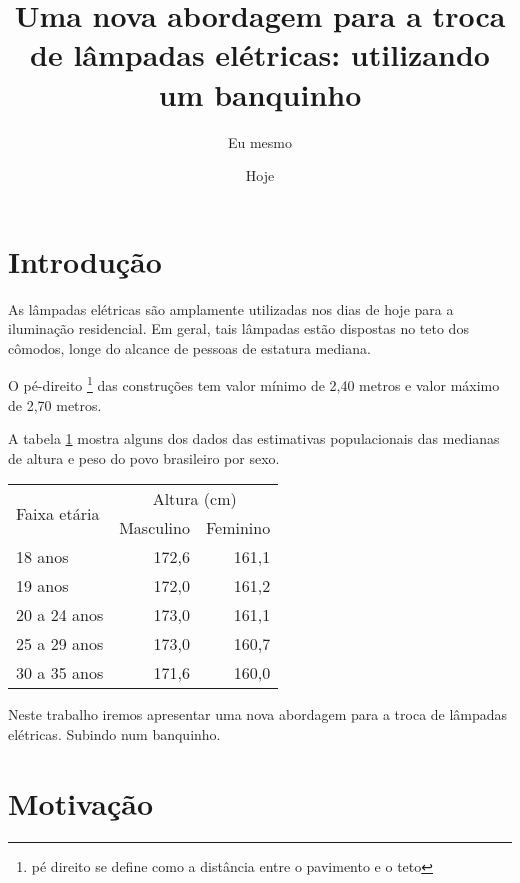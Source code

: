 \documentclass{article}
\author{Eu mesmo}
\date{Hoje}
\title{Uma nova abordagem para a troca de
       lâmpadas elétricas: utilizando um banquinho}
\begin{document}
\maketitle

\newpage

\section{Introdução}
\label{sec:intro}

As lâmpadas elétricas são amplamente utilizadas nos dias
de hoje para a iluminação residencial.
Em geral, tais lâmpadas estão dispostas no teto dos cômodos,
longe do alcance de pessoas de estatura mediana.

O pé-direito 
\footnote{pé direito se define como a distância entre o pavimento e o teto}
das construções tem valor mínimo de 2,40 metros e valor máximo de 2,70 metros.

A tabela \ref{tab:ibge} mostra alguns dos dados das estimativas populacionais das
medianas de altura e peso do povo brasileiro por sexo.

\begin{table}[!htb]
  	\centering
  	\begin{tabular}{|l|r|r|}
  	\hline
    \multirow{2}{*}{Faixa etária} & \multicolumn{2}{|c|}{Altura (cm)} \\ \cline{2-3}
                 & Masculino & Feminino \\ \hline
    18      anos & 172,6 & 161,1 \\
    19      anos & 172,0 & 161,2 \\
    20 a 24 anos & 173,0 & 161,1 \\
    25 a 29 anos & 173,0 & 160,7 \\
    30 a 35 anos & 171,6 & 160,0 \\
    \hline
    \end{tabular}
    \label{tab:ibge}
\end{table}

Neste trabalho  iremos apresentar uma nova abordagem
para a troca  de lâmpadas elétricas.
Subindo  num  banquinho. %


\section{Motivação}
\label{sec:motiv}
\end{document}
